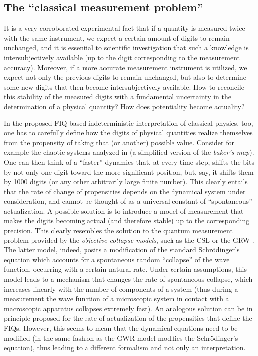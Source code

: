 \documentclass[12pt]{article}
\begin{document}
 \subsection{The ``classical measurement problem''} 
It is a very corroborated experimental fact that if a quantity is measured twice with the same instrument, we expect a certain amount of digits to remain unchanged, and it is essential to scientific investigation that such a knowledge is intersubjectively available (up to the digit corresponding to the measurement accuracy). Moreover, if a more accurate measurement instrument is utilized, we expect not only the previous digits to remain unchanged, but also to determine some new digits that then become intersubjectively available. How to reconcile this stability of the measured digits with a fundamental uncertainty in the determination of a physical quantity? How does potentiality  become actuality?

In the proposed FIQ-based indeterministic interpretation of classical physics, too, one has to carefully define how the digits of physical quantities realize themselves from the propensity of taking that (or another) possible value. Consider for example the chaotic systems analyzed in \cite{gisin1} (a simplified version of the \emph{baker's map}). One can then think of a ``faster'' dynamics that, at every time step, shifts the bits by not only one digit toward the more significant position, but, say, it shifts them by 1000 digits (or any other arbitrarily large finite number). This clearly entails that the rate of change of propensities depends on the dynamical system under consideration, and cannot be thought of as a universal constant of ``spontaneous'' actualization.  A possible solution is to introduce a model of measurement that makes the digits becoming actual (and therefore stable) up to the corresponding precision. This clearly resembles the solution to the quantum measurement problem provided by the \emph{objective collapse models}, such as the CSL \cite{gisincollapse, cls} or the GRW \cite{grw, belljumps}. The latter model, indeed, posits a modification of the standard Schr{\"o}dinger's equation which accounts for a spontaneous random ``collapse'' of the wave function, occurring with a certain natural rate. Under certain assumptions, this model leads to a mechanism that changes the rate of spontaneous collapse, which increases linearly with the number of components of a system (thus during a measurement the wave function of a microscopic system in contact with a macroscopic apparatus collapses extremely fast). An analogous solution can be in principle proposed for the rate of actualization of the propensities that define the FIQs. However, this seems to mean that the dynamical equations need to be modified (in the same fashion as the GWR model modifies the Schr{\"o}dinger's equation), thus leading to a different formalism and not only an interpretation.
\end{document}
